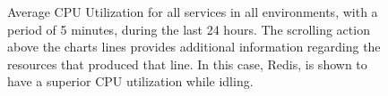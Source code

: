 \begin{figure}[!htbp]
    \centering
    \caption[AWS ECS Advanced Monitoring Example 3]{Average CPU Utilization for all services in all environments, with a period of 5 minutes, during the last 24 hours. The scrolling action above the charts lines provides additional information regarding the resources that produced that line. In this case, Redis, is shown to have a superior CPU utilization while idling.}
    \label{fig:ecs-example-03}
\end{figure} 
    